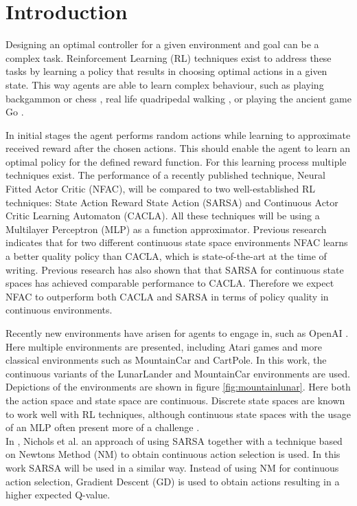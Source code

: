 
\section{Introduction}

Designing an optimal controller for a given environment and goal can be a complex task. Reinforcement Learning (RL) techniques exist to address these tasks by learning a policy that results in choosing optimal actions in a given state. This way agents are able to learn complex behaviour, such as playing backgammon \cite{tesauro2002programming} or chess \cite{baxter1999knightcap},
real life quadripedal walking \cite{kohl2004policy}, or playing the ancient game Go \cite{alphago}.   

In initial stages the agent performs random actions while learning to approximate received reward after the chosen actions. This should enable the agent to learn an optimal policy for the defined reward function. For this learning process multiple techniques exist. The performance of a recently published technique, Neural Fitted Actor Critic (NFAC), will be compared to two well-established RL techniques: State Action Reward State Action (SARSA) and Continuous Actor Critic Learning Automaton (CACLA). All these techniques will be using a Multilayer Perceptron (MLP) as a function approximator. Previous research \cite{zimmer2016neural} indicates that for two different continuous state space environments NFAC learns a better quality policy than CACLA, which is state-of-the-art at the time of writing. Previous research \cite{nichols2015continuous} has also shown that that SARSA for continuous state spaces has achieved comparable performance to CACLA. Therefore we expect NFAC to outperform both CACLA and SARSA in terms of policy quality in continuous environments.

Recently new environments have arisen for agents to engage in, such as OpenAI \cite{openaigym}. Here multiple environments are presented, including Atari games and more classical environments such as MountainCar and CartPole. In this work, the continuous variants of the LunarLander and MountainCar environments are used. Depictions of the environments are shown in figure \ref{fig:mountainlunar}. Here both the action space and state space are continuous.  Discrete state spaces are known to work well with RL techniques, although continuous state spaces with the usage of an MLP often present more of a challenge \cite{cetina2008multilayer}. \\
In \cite{nichols2015continuous}, Nichols et al. an approach of using SARSA together with a technique based on Newtons Method (NM) to obtain continuous action selection is used. In this work SARSA will be used in a similar way. Instead of using NM for continuous action selection, Gradient Descent (GD) is used to obtain actions resulting in a higher expected Q-value.

